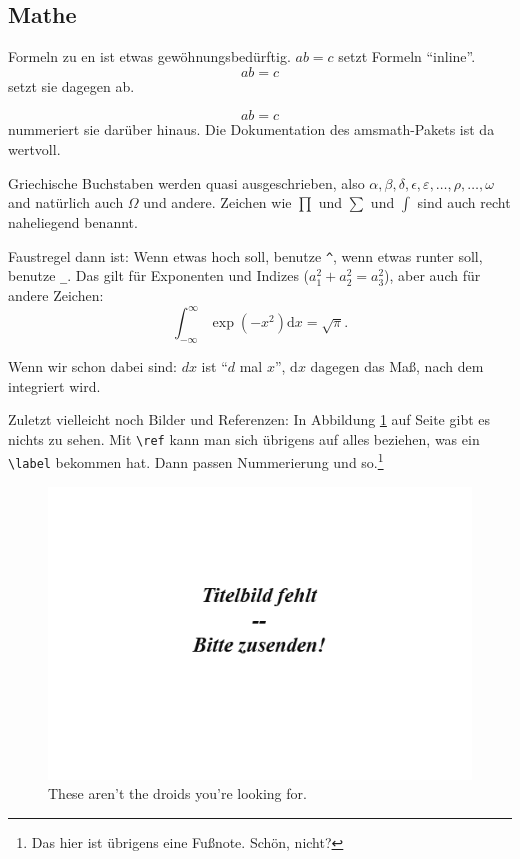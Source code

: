\documentclass{doku2018}
\begin{document}
\subsection{Mathe}

Formeln zu  en ist etwas gewöhnungsbedürftig. $ab=c$ setzt Formeln
"`inline"'. \[ab=c\] setzt sie dagegen ab.

\begin{equation}
  ab=c
\end{equation} nummeriert sie darüber hinaus. Die Dokumentation des amsmath-Pakets ist da
wertvoll.

Griechische Buchstaben werden quasi ausgeschrieben, also $\alpha, \beta, \delta,
\epsilon, \varepsilon, \dots, \rho, \dots,\omega$ and natürlich auch $\Omega$
und andere. Zeichen wie $\prod$ und $\sum$ und $\int$ sind auch recht
naheliegend benannt.

Faustregel dann ist: Wenn etwas hoch soll, benutze \verb|^|, wenn etwas runter
soll, benutze \verb|_|. Das gilt für Exponenten und Indizes
($a_1^2+a_2^2=a_3^2$), aber auch für andere Zeichen: \[ \int_{-\infty}^{\infty}
  \exp(-x^2)\mathrm{d}x = \sqrt{\pi}.\]

Wenn wir schon dabei sind: $dx$ ist "`$d$ mal $x$"', $\mathrm{d}x$ dagegen das
Maß, nach dem integriert wird.

Zuletzt vielleicht noch Bilder und Referenzen: In Abbildung
\ref{fig:starwarsreferenz} auf Seite \pageref{fig:starwarsreferenz} gibt es
nichts zu sehen. Mit \verb|\ref| kann man sich übrigens auf alles beziehen, was
ein \verb|\label| bekommen hat. Dann passen Nummerierung und so.\footnote{Das
  hier ist übrigens eine Fußnote. Schön, nicht?}

\begin{figure}
\begin{center}
\includegraphics[width=.9\columnwidth]{Titelbild-fehlt.png}
\caption{These aren't the droids you're looking for.}
\label{fig:starwarsreferenz}
\end{center}
\end{figure}
\end{document}
